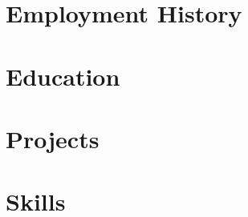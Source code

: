 \documentclass[9pt]{resume}
\begin{document}
\maketitle

\section{Employment History}










\section{Education}




\section{Projects}













\section{Skills}









\end{document}
